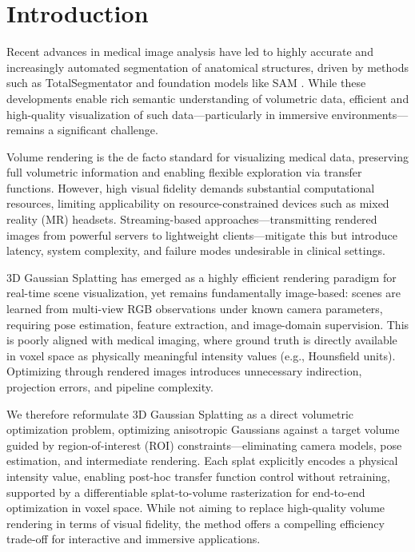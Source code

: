 \documentclass[runningheads]{llncs}
\begin{document}
\section{Introduction}

Recent advances in medical image analysis have led to highly accurate and increasingly automated segmentation of anatomical structures, driven by methods such as TotalSegmentator \cite{totalsegmentator} and foundation models like SAM \cite{sam3d}. While these developments enable rich semantic understanding of volumetric data, efficient and high-quality visualization of such data—particularly in immersive environments—remains a significant challenge.

Volume rendering is the de facto standard for visualizing medical data, preserving full volumetric information and enabling flexible exploration via transfer functions. However, high visual fidelity demands substantial computational resources, limiting applicability on resource-constrained devices such as mixed reality (MR) headsets. Streaming-based approaches—transmitting rendered images from powerful servers to lightweight clients—mitigate this but introduce latency, system complexity, and failure modes undesirable in clinical settings.

3D Gaussian Splatting \cite{kerbl2023gaussiansplatting} has emerged as a highly efficient rendering paradigm for real-time scene visualization, yet remains fundamentally image-based: scenes are learned from multi-view RGB observations under known camera parameters, requiring pose estimation, feature extraction, and image-domain supervision. This is poorly aligned with medical imaging, where ground truth is directly available in voxel space as physically meaningful intensity values (e.g., Hounsfield units). Optimizing through rendered images introduces unnecessary indirection, projection errors, and pipeline complexity.

We therefore reformulate 3D Gaussian Splatting as a direct volumetric optimization problem, optimizing anisotropic Gaussians against a target volume guided by region-of-interest (ROI) constraints—eliminating camera models, pose estimation, and intermediate rendering. Each splat explicitly encodes a physical intensity value, enabling post-hoc transfer function control without retraining, supported by a differentiable splat-to-volume rasterization for end-to-end optimization in voxel space. While not aiming to replace high-quality volume rendering in terms of visual fidelity, the method offers a compelling efficiency trade-off for interactive and immersive applications.
\end{document}
